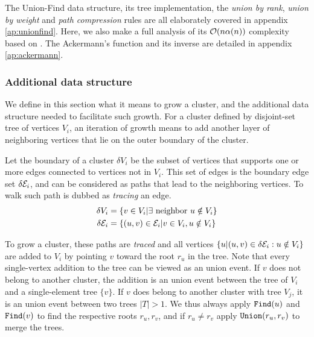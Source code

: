 The Union-Find data structure, its tree implementation, the \emph{union by rank}, \emph{union by weight} and \emph{path compression} rules are all elaborately covered in appendix \ref{ap:unionfind}. Here, we also make a full analysis of its $\mathcal{O}(n\alpha(n))$ complexity based on \cite{kozen1992design}. The Ackermann's function and its inverse are detailed in appendix \ref{ap:ackermann}.

\subsubsection{Additional data structure}
We define in this section what it means to grow a cluster, and the additional data structure needed to facilitate such growth. For a cluster defined by disjoint-set tree of vertices $V_i$, an iteration of growth means to add another layer of neighboring vertices that lie on the outer boundary of the cluster. 
\begin{definition}\label{def:clusterboud}
  Let the boundary of a cluster $\delta V_i$ be the subset of vertices that supports one or more edges connected to vertices not in $V_i$. This set of edges is the boundary edge set $\delta \mathcal{E}_i$, and can be considered as paths that lead to the neighboring vertices. To walk such path is dubbed as \emph{tracing} an edge. 
  \begin{align}
    \delta V_i&= \left\{ v \in V_i | \exists \text{ neighbor }  u \notin V_i \right\} \\
    \delta \mathcal{E}_i &= \{(u,v)\in \mathcal{E}_i | v \in V_i, u \notin V_i \}
  \end{align}
\end{definition}
To grow a cluster, these paths are \emph{traced} and all vertices $\{u | (u,v) \in \delta \mathcal{E}_i: u \notin V_i\}$ are added to $V_i$ by pointing $v$ toward the root $r_u$ in the tree. Note that every single-vertex addition to the tree can be viewed as an union event. If $v$ does not belong to another cluster, the addition is an union event between the tree of $V_i$ and a single-element tree $\{v\}$. If $v$ does belong to another cluster with tree $V_j$, it is an union event between two trees $|T|>1$. We thus always apply $\texttt{Find}(u)$ and $\texttt{Find}(v)$ to find the respective roots $r_u, r_v$, and if $r_u\neq r_v$ apply $\texttt{Union}(r_u, r_v)$ to merge the trees.

